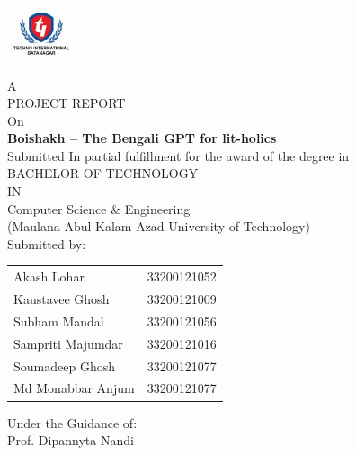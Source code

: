 \documentclass[12pt]{article}
\begin{document}
\begin{titlepage}
    \begin{center}
        \vspace*{0.5cm}
        
        \includegraphics[width=2cm]{university-logo.jpeg}
        
        \vspace{0.5cm}
        {\large A}\\[0.3cm]
        {\large PROJECT REPORT}\\[0.3cm]
        {\large On}\\[0.5cm]
        
        {\LARGE\textbf{Boishakh -- The Bengali GPT for lit-holics}}\\[1cm]
        
        {\large Submitted In partial fulfillment for the award of the degree in}\\[0.7cm]
        
        {\Large BACHELOR OF TECHNOLOGY}\\[0.3cm]
        {\large IN}\\[0.3cm]
        {\large Computer Science \& Engineering}\\[0.3cm]
        
        {\large (Maulana Abul Kalam Azad University of Technology)}\\[1cm]
        
        {\large Submitted by:}\\[0.5cm]
        
        \begin{tabular}{ll}
            Akash Lohar & 33200121052\\
            Kaustavee Ghosh & 33200121009\\
            Subham Mandal & 33200121056\\
            Sampriti Majumdar & 33200121016\\
            Soumadeep Ghosh & 33200121077\\
            Md Monabbar Anjum & 33200121077
        \end{tabular}
        
        \vfill
        
        {\large Under the Guidance of:}\\[0.3cm]
        {\large Prof. Dipannyta Nandi}
        
    \end{center}
\end{titlepage}
\end{document}

